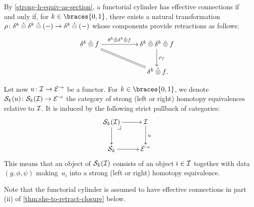 \documentclass[reqno,10pt,a4paper,oneside,draft]{amsart}
\begin{document}
\begin{remark} \label{thm:retraction-for-connections}
By \cref{strong-h-equiv-as-section}, a functorial cylinder has effective connections if and only if, for $k \in \braces{0, 1}$, there exists a natural transformation $\rho \co \kcyl \hatotimes \kcyl \hatotimes (-) \to \kcyl \hatotimes (-)$ whose components provide retractions as follows:
\begin{gather*}
\xymatrix@C+3em{
  \kcyl \hatotimes f
  \ar[r]^-{\thetak \hatotimes \kcyl \hatotimes f}
  \ar@{=}[dr]
&
  \kcyl \hatotimes \kcyl \hatotimes f
  \ar[d]^{\rho_f}
\\&
  \kcyl \hatotimes f
\rlap{.}}
\end{gather*}
\end{remark}


Let now $u \co \cal{I} \to \catE^\to$ be a functor.
For $k \in \braces{0, 1}$, we denote $\cal{S}_k(u) \co \cal{S}_k(\cal{I}) \to \catE^\to$ the category of strong (left or right) homotopy equivalences relative to $\cal{I}$.
It is induced by the following strict pullback of categories:
\[
\xymatrix{
  \cal{S}_k(\cal{I})
  \ar[r]
  \ar[d]
  \pullback{dr}
&
  \cal{I}
  \ar[d]^{u}
\\
  \cal{S}_k
  \ar[r]
&
  \catE^\to
}
\]
This means that an object of $\cal{S}_k(\cal{I})$ consists of an object $i \in \cal{I}$ together with data $(g, \phi, \psi)$ making~$u_i$ into a strong (left or right) homotopy equivalence.

\medskip

Note that the functorial cylinder is assumed to have effective connections in part (ii) of \cref{thm:she-to-retract-closure} below.
\end{document}
